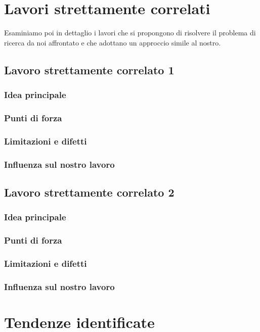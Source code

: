 \section{Lavori strettamente correlati}

Esaminiamo poi in dettaglio i lavori che si propongono di risolvere il problema di ricerca da noi affrontato e che adottano un approccio simile al nostro.

\subsection{Lavoro strettamente correlato 1}
\subsubsection{Idea principale}
\subsubsection{Punti di forza}
\subsubsection{Limitazioni e difetti}
\subsubsection{Influenza sul nostro lavoro}

\subsection{Lavoro strettamente correlato 2}
\subsubsection{Idea principale}
\subsubsection{Punti di forza}
\subsubsection{Limitazioni e difetti}
\subsubsection{Influenza sul nostro lavoro}

\section{Tendenze identificate}

